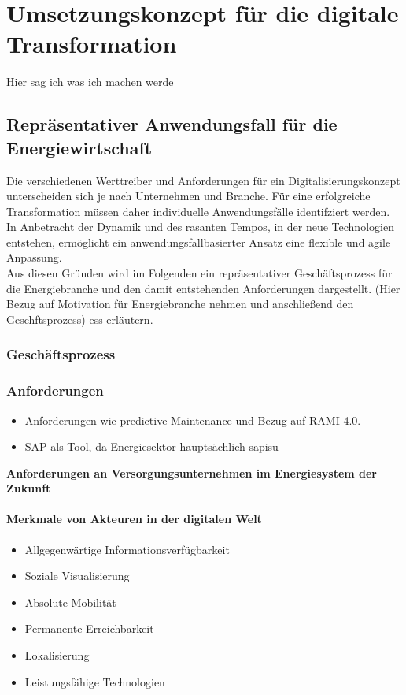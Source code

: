 \section{Umsetzungskonzept für die digitale Transformation}

 Hier sag ich was ich machen werde

\subsection{Repräsentativer Anwendungsfall für die Energiewirtschaft}

Die verschiedenen Werttreiber und Anforderungen für ein Digitalisierungskonzept unterscheiden sich je nach Unternehmen und Branche.
Für eine erfolgreiche Transformation müssen daher individuelle Anwendungsfälle identifziert werden.
In Anbetracht der Dynamik und des rasanten Tempos, in der neue Technologien entstehen,
ermöglicht ein anwendungsfallbasierter Ansatz eine flexible und agile Anpassung. \citep[S. 31]{Acharya2019}
\\Aus diesen Gründen wird im Folgenden ein repräsentativer Geschäftsprozess für die Energiebranche
und den damit entstehenden Anforderungen dargestellt.
\newline (Hier Bezug auf Motivation für Energiebranche nehmen und anschließend den Geschftsprozess)
ess erläutern.

\subsubsection{Geschäftsprozess}

\subsubsection{Anforderungen}
\begin{itemize}
  \item Anforderungen wie predictive Maintenance und Bezug auf RAMI 4.0.
  \item SAP als Tool, da Energiesektor hauptsächlich \acf{sapisu}
\end{itemize}

\textbf{Anforderungen an Versorgungsunternehmen im Energiesystem der Zukunft \citep[S. 19]{Doleski2016}}

\paragraph{Merkmale von Akteuren in der digitalen Welt}
\begin{itemize}
  \item Allgegenwärtige Informationsverfügbarkeit
  \item Soziale Visualisierung
  \item Absolute Mobilität
  \item Permanente Erreichbarkeit
  \item Lokalisierung
  \item Leistungsfähige Technologien
\end{itemize}

